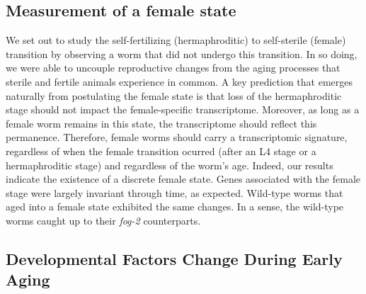 \documentclass[10pt,letterpaper,twocolumn]{article}
\newcommand{\fog}{\emph{fog-2}}
\begin{document}
\subsection*{Measurement of a female state}
\label{sub:female_state}

We set out to study the self-fertilizing (hermaphroditic) to self-sterile (female) transition by observing a worm that did not undergo this transition. In so doing, we were able to uncouple reproductive changes from the aging processes that sterile and fertile animals experience in common. A key prediction that emerges naturally from postulating the female state is that loss of the hermaphroditic stage should not impact the female-specific transcriptome. Moreover, as long as a female worm remains in this state, the transcriptome should reflect this permanence. Therefore, female worms should carry a transcriptomic signature, regardless of when the female transition ocurred (after an L4 stage or a hermaphroditic stage) and regardless of the worm's age.
Indeed, our results indicate the existence of a discrete female state. Genes associated with the female stage were largely invariant through time, as expected. Wild-type worms that aged into a female state exhibited the same changes. In a sense, the wild-type worms caught up to their \fog{} counterparts.



\subsection*{Developmental Factors Change During Early Aging}
\label{sub:development_in_aging}
\end{document}
